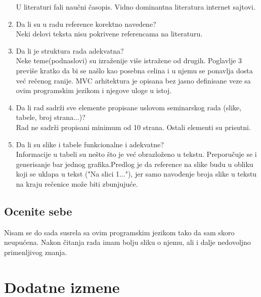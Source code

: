 \documentclass[a4paper]{report}
\begin{document}
\begin{enumerate}
U literaturi fali naučni časopis. Vidno dominantna literatura internet sajtovi.
\item Da li su u radu reference korektno navedene?\\
Neki delovi teksta nisu pokrivene referencama na literaturu. 
\item Da li je struktura rada adekvatna?\\
Neke teme(podnaslovi) su izraženije više istražene od drugih. Poglavlje 3 previše kratko da bi se našlo kao posebna celina i u njemu se ponavlja dosta već rečenog ranije. MVC arhitektura je opisana bez jasno definisane veze sa ovim programskim jezikom i njegove uloge u istoj.
\item Da li rad sadrži sve elemente propisane uslovom seminarskog rada (slike, tabele, broj strana...)?\\
Rad ne sadrži propisani minimum od 10 strana. Ostali elementi su prisutni.
\item Da li su slike i tabele funkcionalne i adekvatne?\\
Informacije u tabeli su nešto što je već obrazloženo u tekstu. Preporučuje se i generisanje bar jednog grafika.Predlog je da reference na slike budu u obliku koji se uklapa u tekst ("Na slici 1..."), jer samo navođenje broja slike u tekstu na kraju rečenice može biti zbunjujuće.
\end{enumerate}

\section{Ocenite sebe}
Nisam se do sada susrela sa ovim programskim jezikom tako da sam skoro neupućena. Nakon čitanja rada imam bolju sliku o njemu, ali i dalje nedovoljno primenljivog znanja.


\chapter{Dodatne izmene}
\end{document}
